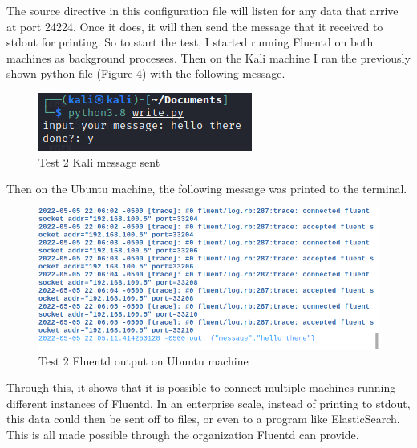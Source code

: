 \documentclass{article}
\begin{document}
The source directive in this configuration file will listen for any data that arrive at port 24224. Once it does, it will then send the message that it received to stdout for printing. So to start the test, I started running Fluentd on both machines as background processes.
Then on the Kali machine I ran the previously shown python file (Figure 4) with the following message.
\begin{figure}[H]
    \centering
    \includegraphics[scale=1]{images/t2_3.png}
    \caption{Test 2 Kali message sent}
    \label{fig:pic9}
\end{figure}
Then on the Ubuntu machine, the following message was printed to the terminal.
\begin{figure}[H]
    \centering
    \includegraphics[scale=0.75]{images/t2_4.png}
    \caption{Test 2 Fluentd output on Ubuntu machine}
    \label{fig:pic10}
\end{figure}
Through this, it shows that it is possible to connect multiple machines running different instances of Fluentd. In an enterprise scale, instead of printing to stdout, this data could then be sent off to files, or even to a program like 
ElasticSearch. This is all made possible through the organization Fluentd can provide.
\end{document}
